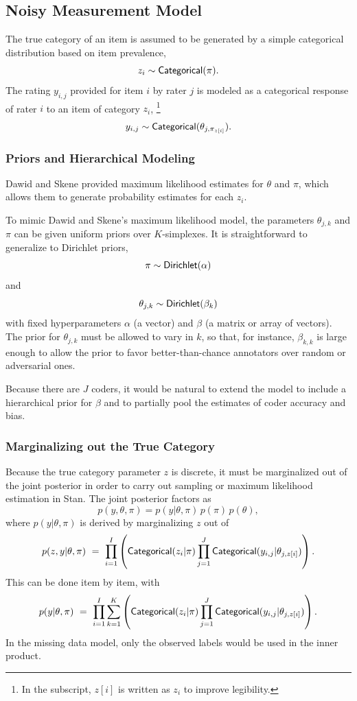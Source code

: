 \subsection{Noisy Measurement Model}

The true category of an item is assumed to be generated by a simple
categorical distribution based on item prevalence,
\[
z_i \sim \distro{Categorical}(\pi).
\]
%
The rating $y_{i, j}$ provided for item $i$ by rater $j$ is modeled as
a categorical response of rater $i$ to an item of category $z_i$,%
%
\footnote{In the subscript, $z[i]$ is written as $z_i$ to
  improve legibility.}
%
\[
y_{i, j} \sim \distro{Categorical}(\theta_{j,\pi_{z[i]}}).
\]

\subsubsection{Priors and Hierarchical Modeling}

Dawid and Skene provided maximum likelihood estimates for $\theta$ and
$\pi$, which allows them to generate probability estimates for each $z_i$.

To mimic Dawid and Skene's maximum likelihood model, the parameters
$\theta_{j,k}$ and $\pi$ can be given uniform priors over
$K$-simplexes.  It is straightforward to generalize to Dirichlet
priors,
\[
\pi \sim \distro{Dirichlet}(\alpha)
\]
and
\[
\theta_{j,k} \sim \distro{Dirichlet}(\beta_k)
\]
with fixed hyperparameters $\alpha$ (a vector) and $\beta$ (a matrix
or array of vectors).  The prior for $\theta_{j,k}$ must be allowed to
vary in $k$, so that, for instance, $\beta_{k,k}$ is large enough to
allow the prior to favor better-than-chance annotators over random or
adversarial ones.

Because there are $J$ coders, it would be natural to extend the model
to include a hierarchical prior for $\beta$ and to partially pool the
estimates of coder accuracy and bias.

\subsubsection{Marginalizing out the True Category}

Because the true category parameter $z$ is discrete, it must be
marginalized out of the joint posterior in order to carry out sampling
or maximum likelihood estimation in Stan. The joint posterior factors
as
\[
p(y, \theta, \pi) = p(y | \theta,\pi) \, p(\pi) \, p(\theta),
\]
where $p(y | \theta,\pi)$ is derived by marginalizing $z$ out of
%
\[
p(z, y | \theta, \pi)
\ = \
\prod_{i=1}^I \left( \distro{Categorical}(z_i | \pi)
                     \prod_{j=1}^J
                     \distro{Categorical}(y_{i, j}|\theta_{j, z[i]})
              \right).
\]
%
This can be done item by item, with
\[
p(y | \theta, \pi)
\ = \
\prod_{i=1}^I \sum_{k=1}^K  
  \left( \distro{Categorical}(z_i | \pi)
         \prod_{j=1}^J
         \distro{Categorical}(y_{i, j}|\theta_{j, z[i]})
  \right).
\]            
%
In the missing data model, only the observed labels would be used in
the inner product.

